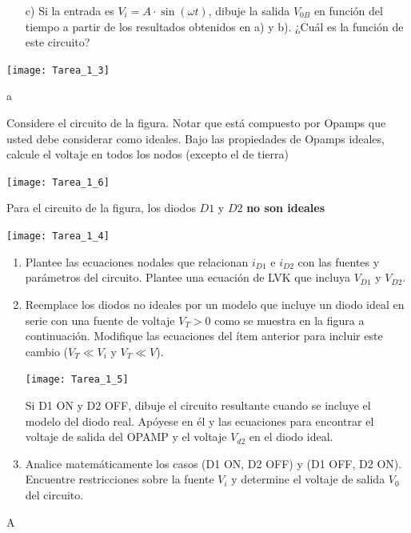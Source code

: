 \documentclass[
  11pt,
  letterpaper,
   addpoints,
  ]{exam}
\begin{document}
\begin{questions}
\begin{enumerate}
    \item[c)] Si la entrada es $V_i = A \cdot \sin(\omega t)$, dibuje la salida $V_{0B}$ en función del tiempo a partir de los resultados obtenidos en a) y b). ¿Cuál es la función de este circuito?
\end{enumerate}
\begin{center}
    \texttt{[image: Tarea\_1\_3]}
\end{center}
\begin{solution}
    a
\end{solution}
\question Considere el circuito de la figura. Notar que está compuesto por Opamps que usted debe considerar como ideales. Bajo las propiedades de Opamps ideales, calcule el voltaje en todos los nodos (excepto el de tierra)
\begin{center}
    \texttt{[image: Tarea\_1\_6]}
\end{center}
\newpage
\question Para el circuito de la figura, los diodos $D1$ y $D2$ \textbf{no son ideales}
\begin{center}
    \texttt{[image: Tarea\_1\_4]}
\end{center}
\begin{enumerate}
    \item Plantee las ecuaciones nodales que relacionan $i_{D1}$ e $i_{D2}$ con las fuentes y parámetros del circuito. Plantee una ecuación de LVK que incluya $V_{D1}$ y $V_{D2}$.
    \item Reemplace los diodos no ideales por un modelo que incluye un diodo ideal en serie con una fuente de voltaje $V_T>0$ como se muestra en la figura a continuación. Modifique las ecuaciones del ítem anterior para incluir este cambio ($V_T\ll V_i$ y $V_T\ll V$).
    \begin{center}
        \texttt{[image: Tarea\_1\_5]}
    \end{center}
    Si D1 ON y D2 OFF, dibuje el circuito resultante cuando se incluye el modelo del diodo
    real. Apóyese en él y las ecuaciones para encontrar el voltaje de salida del OPAMP y el voltaje $V_{d2}$ en el diodo ideal.
    
    \item Analice matemáticamente los casos (D1 ON, D2 OFF) y (D1 OFF, D2 ON). Encuentre restricciones sobre la fuente $V_i$ y determine el voltaje de salida $V_0$ del circuito.
\end{enumerate}
\begin{solution}
   A
\end{solution}


\end{questions}
\end{document}
